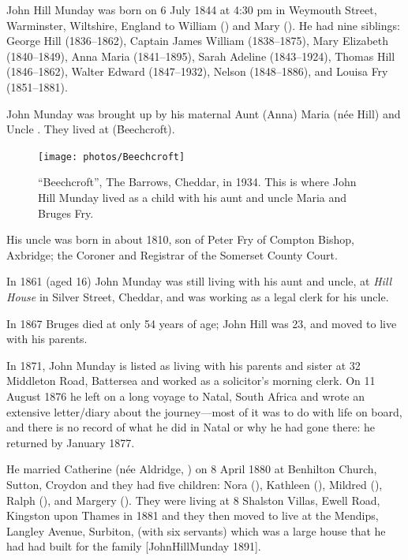 
John Hill Munday was born on 6 July 1844 at 4:30 pm\cite{GeorgeHillMundayNotes} in Weymouth Street, Warminster, Wiltshire, England\cite{JHMtree, Census1861, JMHbirth} to William () and Mary (). He had nine siblings: George Hill (1836--1862), Captain James William (1838--1875), Mary Elizabeth (1840--1849), Anna Maria (1841--1895), Sarah Adeline (1843--1924), Thomas Hill (1846--1862), Walter Edward (1847--1932), Nelson (1848--1886), and Louisa Fry (1851--1881).

John Munday was brought up by his maternal Aunt (Anna) Maria (n\'{e}e Hill) and Uncle . They lived at  (\f{Beechcroft}).

\begin{figure}
	\centering
	\texttt{[image: photos/Beechcroft]}
	\caption{``Beechcroft'', The Barrows, Cheddar, in 1934. This is where John Hill Munday lived as a child with his aunt and uncle Maria and Bruges Fry.\cite{BeechcroftPostcard}}
	\label{Beechcroft}
\end{figure}

His uncle was born in about 1810, son of Peter Fry of Compton Bishop, Axbridge; the Coroner and Registrar of the Somerset County Court.

In 1861 (aged 16) John Munday was still living with his aunt and uncle, at \emph{Hill House} in Silver Street, Cheddar,\cite{Census1861} 
and was working as a legal clerk for his uncle.\cite{Census1861}

In 1867 Bruges died at only 54 years of age;\cite{BrugesDeath} John Hill was 23, and moved to live with his parents.

In 1871, John Munday is listed as living with his parents and sister at 32 Middleton Road, Battersea and worked as a solicitor's morning clerk.\cite{JohnHillMunday1871} On 11 August 1876 he left on a long voyage to Natal, South Africa and wrote an extensive letter/diary about the journey---most of it was to do with life on board, and there is no record of what he did in Natal or why he had gone there: he returned by January 1877.

He married Catherine (n\'{e}e Aldridge, ) on 8 April 1880 at Benhilton Church, Sutton, Croydon\cite{JHM-CA-marriage-announcement, JHMtree} and they had five children: Nora (), Kathleen (), Mildred (), Ralph (), and Margery ().  They were living at 8 Shalston Villas, Ewell Road, Kingston upon Thames in 1881\cite{JohnHillMunday1881} and they then moved to live at the Mendips, Langley Avenue, Surbiton, (with six servants)  which was  a large house that he had had  built for the family [JohnHillMunday 1891].

